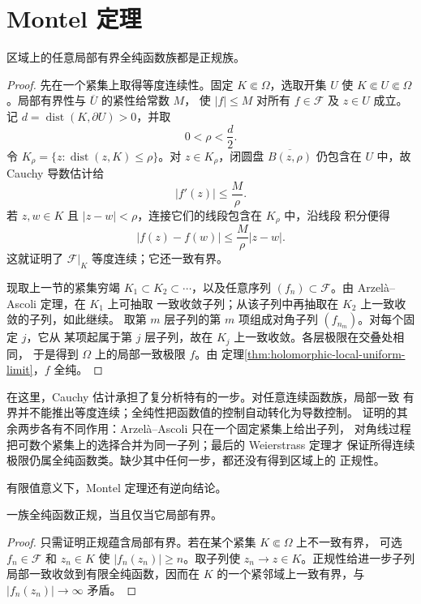 \section{Montel 定理}

\begin{theorem}[Montel 定理]\label{thm:montel-locally-bounded}
区域上的任意局部有界全纯函数族都是正规族。
\end{theorem}

\begin{proof}
先在一个紧集上取得等度连续性。固定 $K\Subset\Omega$，选取开集 $U$ 使
$K\Subset U\Subset\Omega$。局部有界性与 $\overline U$ 的紧性给常数 $M$，
使 $|f|\le M$ 对所有 $f\in\mathcal F$ 及 $z\in U$ 成立。记
$d=\operatorname{dist}(K,\partial U)>0$，并取
\[
 0<\rho<\frac d2.
\]
令 $K_\rho=\{z:\operatorname{dist}(z,K)\le\rho\}$。对
$z\in K_\rho$，闭圆盘 $\overline{B(z,\rho)}$ 仍包含在 $U$ 中，故 Cauchy
导数估计给
\[
 |f'(z)|\le \frac{M}{\rho}.
\]
若 $z,w\in K$ 且 $|z-w|<\rho$，连接它们的线段包含在 $K_\rho$ 中，沿线段
积分便得
\[
 |f(z)-f(w)|\le \frac{M}{\rho}|z-w|.
\]
这就证明了 $\mathcal F|_K$ 等度连续；它还一致有界。

现取上一节的紧集穷竭 $K_1\subset K_2\subset\cdots$，以及任意序列
$(f_n)\subset\mathcal F$。由 Arzel\`a--Ascoli 定理，在 $K_1$ 上可抽取
一致收敛子列；从该子列中再抽取在 $K_2$ 上一致收敛的子列，如此继续。
取第 $m$ 层子列的第 $m$ 项组成对角子列 $(f_{n_m})$。对每个固定 $j$，它从
某项起属于第 $j$ 层子列，故在 $K_j$ 上一致收敛。各层极限在交叠处相同，
于是得到 $\Omega$ 上的局部一致极限 $f$。由
定理\ref{thm:holomorphic-local-uniform-limit}，$f$ 全纯。
\end{proof}

在这里，Cauchy 估计承担了复分析特有的一步。对任意连续函数族，局部一致
有界并不能推出等度连续；全纯性把函数值的控制自动转化为导数控制。
证明的其余两步各有不同作用：Arzel\`a--Ascoli 只在一个固定紧集上给出子列，
对角线过程把可数个紧集上的选择合并为同一子列；最后的 Weierstrass 定理才
保证所得连续极限仍属全纯函数类。缺少其中任何一步，都还没有得到区域上的
正规性。

有限值意义下，Montel 定理还有逆向结论。

\begin{proposition}\label{prop:normal-iff-locally-bounded}
一族全纯函数正规，当且仅当它局部有界。
\end{proposition}

\begin{proof}
只需证明正规蕴含局部有界。若在某个紧集 $K\Subset\Omega$ 上不一致有界，
可选 $f_n\in\mathcal F$ 和 $z_n\in K$ 使 $|f_n(z_n)|\ge n$。取子列使
$z_n\to z\in K$。正规性给进一步子列局部一致收敛到有限全纯函数，因而在
$K$ 的一个紧邻域上一致有界，与 $|f_n(z_n)|\to\infty$ 矛盾。
\end{proof}

